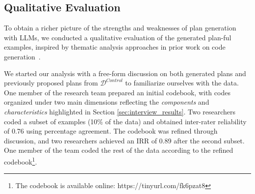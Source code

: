 


\subsection{Qualitative Evaluation}

To obtain a richer picture of the strengths and weaknesses of plan generation with LLMs, we conducted a qualitative evaluation of the generated plan-ful examples, inspired by thematic analysis approaches in prior work on code generation~\cite{kazemitabaarHowNovicesUse2023}.

We started our analysis with a free-form discussion on both generated plans and previously proposed plans from \(\mathcal{D}^{\textit{Control}}\) to familiarize ourselves with the data. One member of the research team prepared an initial codebook, with codes organized under two main dimensions reflecting the \textit{components} and \textit{characteristics} highlighted in Section \ref{sec:interview_results}.
Two researchers coded a subset of examples (10\% of the data) and obtained inter-rater reliability of 0.76 using percentage agreement\cite{miles1994qualitative}. The codebook was refined through discussion, and two researchers achieved an IRR of 0.89 after the second subset. One member of the team coded the rest of the data according to the refined codebook\footnote{The codebook is available online: https://tinyurl.com/fk6pzat8}.

